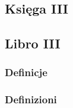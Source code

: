 %


\subsection{Księga III} %
\subsection{Libro III} %

\subsubsection{Definicje} %
\subsubsection{Definizioni} %

